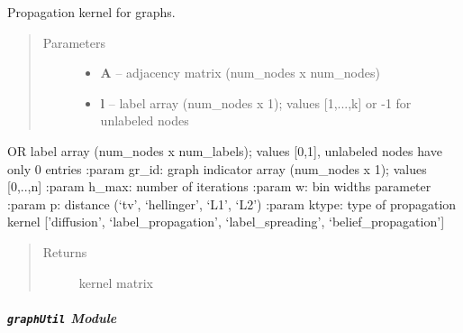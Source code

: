 \documentclass[letterpaper,10pt,english]{sphinxmanual}
\begin{document}
\begin{fulllineitems}
\label{pyGPs.GraphExtensions:pyGPs.GraphExtensions.graphKernels.propagationKernel}
Propagation kernel for graphs.
\begin{quote}\begin{description}
\item[{Parameters}] \leavevmode\begin{itemize}
\item {} 
\textbf{A} -- adjacency matrix (num\_nodes x num\_nodes)

\item {} 
\textbf{l} -- label array (num\_nodes x 1); values {[}1,...,k{]} or -1 for unlabeled nodes

\end{itemize}

\end{description}\end{quote}

OR label array (num\_nodes x num\_labels); values {[}0,1{]}, unlabeled nodes have only 0 entries
:param gr\_id: graph indicator array (num\_nodes x 1); values {[}0,..,n{]}
:param h\_max: number of iterations
:param w: bin widths parameter
:param p: distance (`tv', `hellinger', `L1', `L2')
:param ktype: type of propagation kernel {[}'diffusion', `label\_propagation', `label\_spreading', `belief\_propagation'{]}
\begin{quote}\begin{description}
\item[{Returns}] \leavevmode
kernel matrix

\end{description}\end{quote}

\end{fulllineitems}



\subparagraph{\texttt{graphUtil} Module}
\label{pyGPs.GraphExtensions:graphutil-module}\label{pyGPs.GraphExtensions:module-pyGPs.GraphExtensions.graphUtil}
\end{document}
